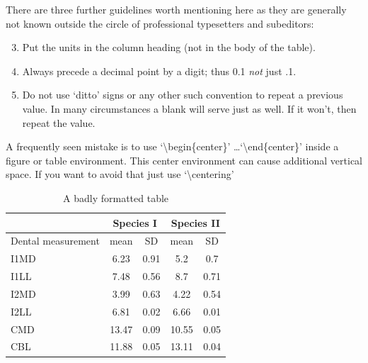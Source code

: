 There are three further guidelines worth mentioning here as they
are generally not known outside the circle of professional
typesetters and subeditors:

\begin{enumerate}\setcounter{enumi}{2}
  \item Put the units in the column heading (not in the body of
          the table).
  \item Always precede a decimal point by a digit; thus 0.1
      {\em not} just .1.
  \item Do not use `ditto' signs or any other such convention to
      repeat a previous value. In many circumstances a blank
      will serve just as well. If it won't, then repeat the value.
\end{enumerate}

A frequently seen mistake is to use `\textbackslash begin\{center\}' \dots `\textbackslash end\{center\}' inside a figure or table environment. This center environment can cause additional vertical space. If you want to avoid that just use `\textbackslash centering'


\begin{table}
\caption{A badly formatted table}
\centering
\label{table:bad_table}
\begin{tabular}{|l|c|c|c|c|}
\hline 
& \multicolumn{2}{c}{Species I} & \multicolumn{2}{c|}{Species II} \\ 
\hline
Dental measurement  & mean & SD  & mean & SD  \\ \hline 
\hline
I1MD & 6.23 & 0.91 & 5.2  & 0.7  \\
\hline 
I1LL & 7.48 & 0.56 & 8.7  & 0.71 \\
\hline 
I2MD & 3.99 & 0.63 & 4.22 & 0.54 \\
\hline 
I2LL & 6.81 & 0.02 & 6.66 & 0.01 \\
\hline 
CMD & 13.47 & 0.09 & 10.55 & 0.05 \\
\hline 
CBL & 11.88 & 0.05 & 13.11 & 0.04\\ 
\hline 
\end{tabular}
\end{table}

